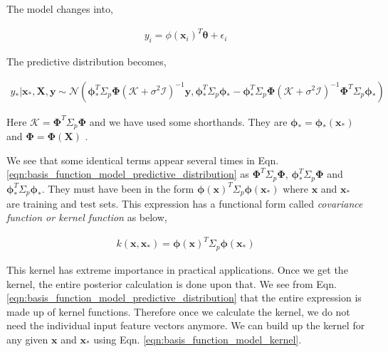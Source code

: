 \documentclass[english]{tktltiki}
\begin{document}
The model changes into,

\begin{equation}
\label{eqn:basis_function_model}
\begin{split}
	y_i = \phi(\mathbf{x}_i)^T \boldsymbol\theta + \epsilon_i
\end{split}
\end{equation}

The predictive distribution becomes,

\begin{equation}
\label{eqn:basis_function_model_predictive_distribution}
\begin{split}
	y_* | \mathbf{x}_*, \mathbf{X}, \mathbf{y} \sim \mathcal{N}(\boldsymbol\phi_*^T \Sigma_p \boldsymbol\Phi(\mathcal{K} + \sigma^2 \mathcal{I})^{-1} \mathbf{y}, \boldsymbol\phi_*^T \Sigma_p \boldsymbol\phi_* - \boldsymbol\phi_*^T \Sigma_p \boldsymbol\Phi(\mathcal{K} + \sigma^2 \mathcal{I})^{-1} \boldsymbol\Phi^T \Sigma_p \boldsymbol\phi_*)
\end{split}
\end{equation}

Here $\mathcal{K} = \boldsymbol\Phi^T \Sigma_p \boldsymbol\Phi$ and we have used some shorthands. They are $\boldsymbol\phi_* = \boldsymbol\phi_*(\mathbf{x}_*)$ and $\boldsymbol\Phi = \boldsymbol\Phi(\mathbf{X})$ \cite{gaussian_process_for_machine_learning}.

We see that some identical terms appear several times in Eqn. \ref{eqn:basis_function_model_predictive_distribution} as $\boldsymbol\Phi^T \Sigma_p \boldsymbol\Phi$, $\boldsymbol\phi_*^T \Sigma_p \boldsymbol\Phi$ and $\boldsymbol\phi_*^T \Sigma_p \boldsymbol\phi_*$. They must have been in the form $\boldsymbol\phi(\mathbf{x})^T \Sigma_p \boldsymbol\phi(\mathbf{x_*})$ where $\mathbf{x}$ and $\mathbf{x_*}$ are training and test sets. This expression has a functional form called \textit{covariance function or kernel function} as below,

\begin{equation}
\label{eqn:basis_function_model_kernel}
\begin{split}
	k(\mathbf{x}, \mathbf{x_*}) = \boldsymbol\phi(\mathbf{x})^T \Sigma_p \boldsymbol\phi(\mathbf{x_*})
\end{split}
\end{equation}

This kernel has extreme importance in practical applications. Once we get the kernel, the entire posterior calculation is done upon that. We see from Eqn. \ref{eqn:basis_function_model_predictive_distribution} that the entire expression is made up of kernel functions. Therefore once we calculate the kernel, we do not need the individual input feature vectors anymore. We can build up the kernel for any given $\mathbf{x}$ and $\mathbf{x_*}$ using Eqn. \ref{eqn:basis_function_model_kernel}.
\end{document}

